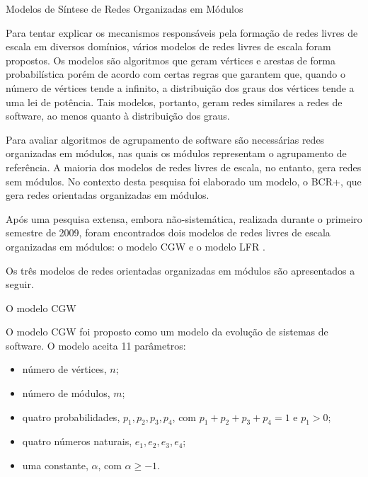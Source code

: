 \begin{section}{Modelos de Síntese de Redes Organizadas em Módulos}

Para tentar explicar os mecanismos responsáveis pela formação de redes livres de escala em diversos domínios, vários modelos de redes livres de escala foram propostos. Os modelos são algoritmos que geram vértices e arestas de forma probabilística porém de acordo com certas regras que garantem que, quando o número de vértices tende a infinito, a distribuição dos graus dos vértices tende a uma lei de potência. Tais modelos, portanto, geram redes similares a redes de software, ao menos quanto à distribuição dos graus.

Para avaliar algoritmos de agrupamento de software são necessárias redes organizadas em módulos, nas quais os módulos representam o agrupamento de referência. A maioria dos modelos de redes livres de escala, no entanto, gera redes sem módulos. No contexto desta pesquisa foi elaborado um modelo, o BCR+, que gera redes orientadas organizadas em módulos. 

Após uma pesquisa extensa, embora não-sistemática, realizada durante o primeiro semestre de 2009, foram encontrados dois modelos de redes livres de escala organizadas em módulos: o modelo CGW \cite{Chen2008} e o modelo LFR \cite{Lancichinetti2009}.

Os três modelos de redes orientadas organizadas em módulos são apresentados a seguir.


\begin{subsection}{O modelo CGW}

O modelo CGW \cite{Chen2008} foi proposto como um modelo da evolução de sistemas de software. O modelo aceita 11 parâmetros:

\begin{itemize}
\item número de vértices, $n$;
\item número de módulos, $m$;
\item quatro probabilidades, $p_1, p_2, p_3, p_4$, com $p_1 + p_2 + p_3 + p_4 = 1$ e $p_1 > 0$;
\item quatro números naturais, $e_1, e_2, e_3, e_4$;
\item uma constante, $\alpha$, com $\alpha \ge -1$.
\end{itemize}


\end{subsection}
\end{section}
